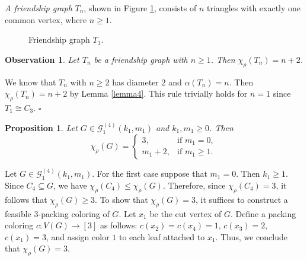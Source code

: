 \documentclass[12pt]{article}
\newtheorem{proposition}[theorem]{Proposition}
\newtheorem{observation}[theorem]{Observation}
\newcommand{\proof}{\noindent{\bf Proof.\ }}
\newcommand{\qed}{\hfill $\square$ \bigskip}
\begin{document}
\textit{A friendship graph} $T_n$, shown in Figure \ref{fig8}, consists of $n$ triangles with exactly one common vertex, where $n \geq 1$.

\begin{figure}[H]
\centering
{}
\caption{Friendship graph $T_3.$}
\label{fig8}
\end{figure}

\begin{observation}\label{lemma5}
Let $T_n$ be a friendship graph with $n \geq 1$. Then $\chi_\rho(T_n)=n+2$.	
\end{observation}

\proof We know that $T_n$ with $n \geq 2$ has diameter $2$ and $\alpha(T_n)=n$. Then $\chi_\rho(T_n)=n+2$ by Lemma \ref{lemma4}. This rule trivially holds for $n=1$ since $T_1 \cong C_3$.
\qed

\begin{proposition}\label{pro10} 
Let $G \in \mathcal{G}_{1}^{(4)}(k_1,m_1)$ and $k_1, m_1 \geq 0$. Then
\[
\chi_\rho(G) =
\begin{cases}
3, & \text{if } m_1 = 0, \\[6pt]
m_1+2, & \text{if } m_1 \geq 1.
\end{cases}
\]
\end{proposition}

\proof 
Let $G \in \mathcal{G}_{1}^{(4)}(k_1,m_1)$.	For the first case suppose that  $m_1= 0$. Then $k_1\geq 1$.  Since $ C_4 \subseteq G$, we have \( \chi_\rho(C_4) \leq \chi_\rho(G) \). Therefore, since \( \chi_\rho(C_4) = 3 \), it follows that \( \chi_\rho(G) \geq 3 \). To show that \( \chi_\rho(G) = 3 \), it suffices to construct a feasible $3$-packing coloring of \( G \). Let $x_1$ be the cut vertex of $G$. Define a packing coloring $c:V(G)\to[3]$ as follows: $c(x_2) = c(x_4)=1$, $c(x_3)=2$, $c(x_1) = 3$, and  assign color $1$ to each leaf attached to $x_1$. Thus, we conclude that  $\chi_\rho(G) =  3$. 
	
\end{document}
